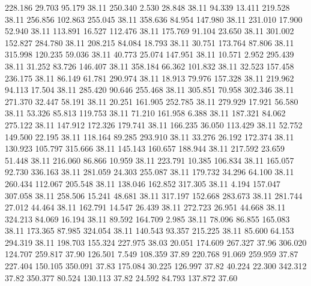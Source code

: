  228.186   29.703   95.179        38.11
 250.340    2.530   28.848        38.11
  94.339   13.411  219.528        38.11
 256.856  102.863  255.045        38.11
 358.636   84.954  147.980        38.11
 231.010   17.900   52.940        38.11
 113.891   16.527  112.476        38.11
 175.769   91.104   23.650        38.11
 301.002  152.827  284.780        38.11
 208.215   84.084   18.793        38.11
  30.751  173.764   87.806        38.11
 315.998  120.235   59.036        38.11
  40.773   25.074  147.951        38.11
  10.571    2.952  295.439        38.11
  31.252   83.726  146.407        38.11
 358.184   66.362  101.832        38.11
  32.523  157.458  236.175        38.11
  86.149   61.781  290.974        38.11
  18.913   79.976  157.328        38.11
 219.962   94.113   17.504        38.11
 285.420   90.646  255.468        38.11
 305.851   70.958  302.346        38.11
 271.370   32.447   58.191        38.11
  20.251  161.905  252.785        38.11
 279.929   17.921   56.580        38.11
  53.326   85.813  119.753        38.11
  71.210  161.958    6.388        38.11
 187.321   84.062  275.122        38.11
 147.912  172.326  179.741        38.11
 166.235   36.050  113.429        38.11
  52.752  149.500   22.195        38.11
 118.164   89.285  293.910        38.11
  33.276   26.192  172.374        38.11
 130.923  105.797  315.666        38.11
 145.143  160.657  188.944        38.11
 217.592   23.659   51.448        38.11
 216.060   86.866   10.959        38.11
 223.791   10.385  106.834        38.11
 165.057   92.730  336.163        38.11
 281.059   24.303  255.087        38.11
 179.732   34.296   64.100        38.11
 260.434  112.067  205.548        38.11
 138.046  162.852  317.305        38.11
   4.194  157.047  307.058        38.11
 258.506   15.241   48.681        38.11
 317.197  152.668  283.673        38.11
 281.744   27.012   44.464        38.11
 162.791   14.547   26.439        38.11
 272.723   26.951   44.668        38.11
 324.213   84.069   16.194        38.11
  89.592  164.709    2.985        38.11
  78.096   86.855  165.083        38.11
 173.365   87.985  324.054        38.11
 140.543   93.357  215.225        38.11
  85.600   64.153  294.319        38.11
 198.703  155.324  227.975        38.03
  20.051  174.609  267.327        37.96
 306.020  124.707  259.817        37.90
 126.501    7.549  108.359        37.89
 220.768   91.069  259.959        37.87
 227.404  150.105  350.091        37.83
 175.084   30.225  126.997        37.82
  40.224   22.300  342.312        37.82
 350.377   80.524  130.113        37.82
  24.592   84.793  137.872        37.60
